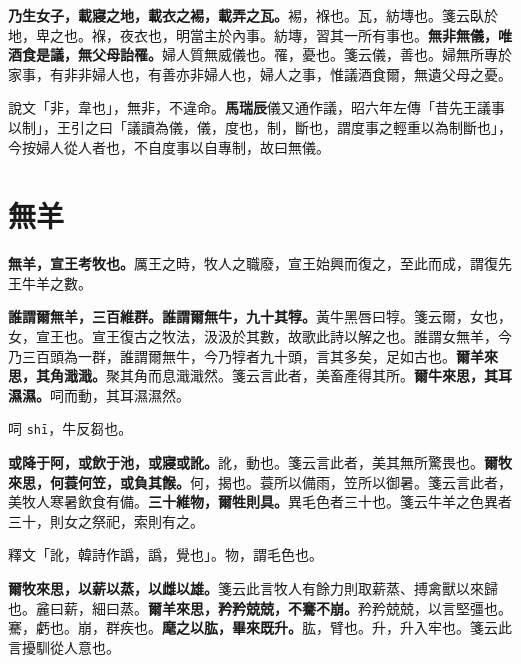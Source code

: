 \textbf{乃生女子，載寢之地，載衣之裼，載弄之瓦。}{\footnotesize 裼，褓也。瓦，紡塼也。箋云臥於地，卑之也。褓，夜衣也，明當主於內事。紡塼，習其一所有事也。}\textbf{無非無儀，唯酒食是議，無父母詒罹。}{\footnotesize 婦人質無威儀也。罹，憂也。箋云儀，善也。婦無所專於家事，有非非婦人也，有善亦非婦人也，婦人之事，惟議酒食爾，無遺父母之憂。}

\begin{quoting}說文「非，韋也」，無非，不違命。\textbf{馬瑞辰}儀又通作議，昭六年左傳「昔先王議事以制」，王引之曰「議讀為儀，儀，度也，制，斷也，謂度事之輕重以為制斷也」，今按婦人從人者也，不自度事以自專制，故曰無儀。\end{quoting}

\section{無羊}


\textbf{無羊，宣王考牧也。}{\footnotesize 厲王之時，牧人之職廢，宣王始興而復之，至此而成，謂復先王牛羊之數。}

\textbf{誰謂爾無羊，三百維群。誰謂爾無牛，九十其犉。}{\footnotesize 黃牛黑唇曰犉。箋云爾，女也，女，宣王也。宣王復古之牧法，汲汲於其數，故歌此詩以解之也。誰謂女無羊，今乃三百頭為一群，誰謂爾無牛，今乃犉者九十頭，言其多矣，足如古也。}\textbf{爾羊來思，其角濈濈。}{\footnotesize 聚其角而息濈濈然。箋云言此者，美畜產得其所。}\textbf{爾牛來思，其耳濕濕。}{\footnotesize 呞而動，其耳濕濕然。}

\begin{quoting}呞 \texttt{shī}，牛反芻也。\end{quoting}

\textbf{或降于阿，或飲于池，或寢或訛。}{\footnotesize 訛，動也。箋云言此者，美其無所驚畏也。}\textbf{爾牧來思，何蓑何笠，或負其餱。}{\footnotesize 何，揭也。蓑所以備雨，笠所以御暑。箋云言此者，美牧人寒暑飲食有備。}\textbf{三十維物，爾牲則具。}{\footnotesize 異毛色者三十也。箋云牛羊之色異者三十，則女之祭祀，索則有之。}

\begin{quoting}釋文「訛，韓詩作譌，譌，覺也」。物，謂毛色也。\end{quoting}

\textbf{爾牧來思，以薪以蒸，以雌以雄。}{\footnotesize 箋云此言牧人有餘力則取薪蒸、搏禽獸以來歸也。麄曰薪，細曰蒸。}\textbf{爾羊來思，矜矜兢兢，不騫不崩。}{\footnotesize 矜矜兢兢，以言堅彊也。騫，虧也。崩，群疾也。}\textbf{麾之以肱，畢來既升。}{\footnotesize 肱，臂也。升，升入牢也。箋云此言擾馴從人意也。}

